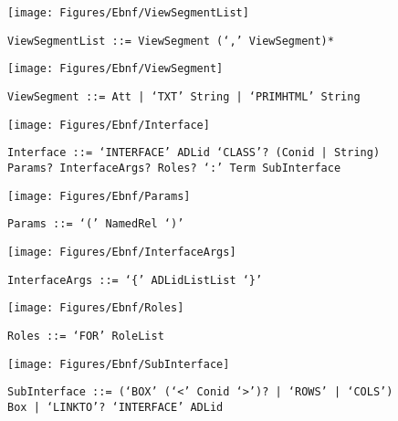  \begin{figure}[H]
  \centering
  \texttt{[image: Figures/Ebnf/ViewSegmentList]}
  \caption*{\texttt{ViewSegmentList \small::=  ViewSegment (`,' ViewSegment)*}}
  \label{fig:ebnf-ViewSegmentList}
 \end{figure}

 \begin{figure}[H]
  \centering
  \texttt{[image: Figures/Ebnf/ViewSegment]}
  \caption*{\texttt{ViewSegment \small::=  Att | `TXT' String | `PRIMHTML' String}}
  \label{fig:ebnf-ViewSegment}
 \end{figure}

 \begin{figure}[H]
  \centering
  \texttt{[image: Figures/Ebnf/Interface]}
  \caption*{\texttt{Interface \small::=  `INTERFACE' ADLid `CLASS'? (Conid | String) Params? InterfaceArgs? Roles? `:' Term SubInterface}}
  \label{fig:ebnf-Interface}
 \end{figure}

 \begin{figure}[H]
  \centering
  \texttt{[image: Figures/Ebnf/Params]}
  \caption*{\texttt{Params \small::=  `(' NamedRel `)'}}
  \label{fig:ebnf-Params}
 \end{figure}

 \begin{figure}[H]
  \centering
  \texttt{[image: Figures/Ebnf/InterfaceArgs]}
  \caption*{\texttt{InterfaceArgs \small::=  `\{' ADLidListList `\}'}}
  \label{fig:ebnf-InterfaceArgs}
 \end{figure}

 \begin{figure}[H]
  \centering
  \texttt{[image: Figures/Ebnf/Roles]}
  \caption*{\texttt{Roles \small::=  `FOR' RoleList}}
  \label{fig:ebnf-Roles}
 \end{figure}

 \begin{figure}[H]
  \centering
  \texttt{[image: Figures/Ebnf/SubInterface]}
  \caption*{\texttt{SubInterface \small::=  (`BOX' (`<' Conid `>')? | `ROWS' | `COLS') Box | `LINKTO'? `INTERFACE' ADLid}}
  \label{fig:ebnf-SubInterface}
 \end{figure}

